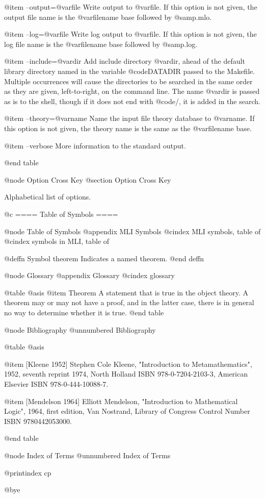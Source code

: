 @item --output=@var{file}
Write output to @var{file}. If this option is not given, the output file name is the
@var{filename base} followed by @samp{.mlo}.

@item --log=@var{file}     
Write log output to @var{file}. If this option is not given, the log file name is the
@var{filename base} followed by @samp{.log}.

@item --include=@var{dir}
Add include directory @var{dir}, ahead of the default library directory named in the variable
@code{DATADIR} passed to the Makefile.
Multiple occurrences will cause the directories to
be searched in the same order as they are given, left-to-right, on the command line.
The name @var{dir} is passed as is to the shell, though if it does not end with
@code{/}, it is added in the search.

@item --theory=@var{name}
Name the input file theory database to @var{name}. If this option is not given, the
theory name is the same as the @var{filename base}.

@item --verbose
More information to the standard output.


@end table


@node Option Cross Key
@section Option Cross Key

Alphabetical list of options.


@c ==== Table of Symbols ====

@node Table of Symbols
@appendix MLI Symbols
@cindex MLI symbols, table of
@cindex symbols in MLI, table of


@deffn {Symbol} theorem
Indicates a named theorem.
@end deffn


@node Glossary
@appendix Glossary
@cindex glossary

@table @asis
@item Theorem
A statement that is true in the object theory. A theorem may or may not have a proof,
and in the latter case, there is in general no way to determine whether it is true.
@end table


@node Bibliography
@unnumbered Bibliography

@table @asis

@item [Kleene 1952]
Stephen Cole Kleene, "Introduction to Metamathematics", 1952, seventh reprint 1974,
North Holland ISBN 978-0-7204-2103-3, American Elsevier ISBN 978-0-444-10088-7.

@item [Mendelson 1964]
Elliott Mendelson, "Introduction to Mathematical Logic", 1964, first edition, Van Nostrand, 
Library of Congress Control Number ISBN 9780442053000.

@end table


@node Index of Terms
@unnumbered Index of Terms

@printindex cp

@bye




